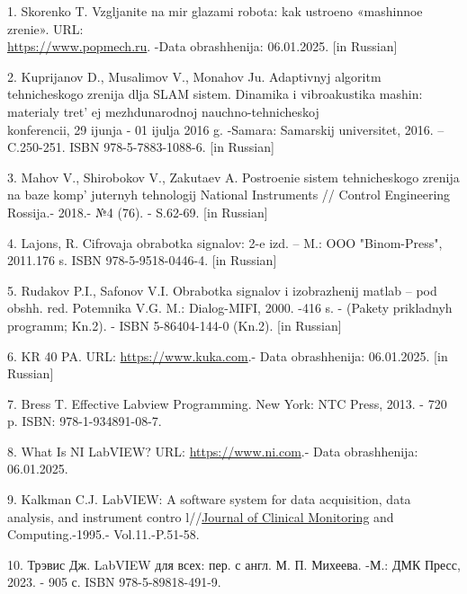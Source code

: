 \begin{references}
1. Skorenko T. Vzgljanite na mir glazami robota: kak ustroeno «mashinnoe
zrenie». URL:\\
\href{https://www.popmech.ru/technologies/238704-glazami-robota-chtotakoe-mashinnoe-zrenie/}{https://www.popmech.ru}. -Data obrashhenija: 06.01.2025. {[}in Russian{]}

2. Kuprijanov D., Musalimov V., Monahov Ju. Adaptivnyj algoritm
tehnicheskogo zrenija dlja SLAM sistem. Dinamika i vibroakustika mashin:
materialy tret' ej mezhdunarodnoj nauchno-tehnicheskoj\\
konferencii, 29 ijunja - 01 ijulja 2016 g. -Samara: Samarskij
universitet, 2016. -- C.250-251. ISBN 978-5-7883-1088-6. {[}in
Russian{]}

3. Mahov V., Shirobokov V., Zakutaev A. Postroenie sistem tehnicheskogo
zrenija na baze komp' juternyh tehnologij National
Instruments // Control Engineering Rossija.- 2018.- №4 (76). - S.62-69.
{[}in Russian{]}

4. Lajons, R. Cifrovaja obrabotka signalov: 2-e izd. -- M.: OOO
"Binom-Press", 2011.176 s. ISBN 978-5-9518-0446-4. {[}in Russian{]}

5. Rudakov P.I., Safonov V.I. Obrabotka signalov i izobrazhenij matlab
-- pod obshh. red. Potemnika V.G. M.: Dialog-MIFI, 2000. -416 s. -
(Pakety prikladnyh programm; Kn.2). - ISBN 5-86404-144-0 (Kn.2). {[}in
Russian{]}

6. KR 40 PA.
URL: \href{https://www.kuka.com/en-de/products/robot-systems/industrial-robots/kr-40-pa.html}{https://www.kuka.com}.-
Data obrashhenija: 06.01.2025. {[}in Russian{]}

7. Bress T. Effective Labview Programming. New York: NTC Press, 2013. -
720 p. ISBN: 978-1-934891-08-7.

8. What Is NI LabVIEW? URL: \href{https://www.ni.com/ru-ru/shop/labview.html}{https://www.ni.com}.-
Data obrashhenija: 06.01.2025.

9. Kalkman C.J. LabVIEW: A software system for data acquisition, data
analysis, and instrument contro
l//\href{https://link.springer.com/journal/10877}{Journal of Clinical
Monitoring} and Computing.-1995.- Vol.11.-P.51-58.

10. Трэвис Дж. LabVIEW для всех: пер. с англ. М. П. Михеева. -М.: ДМК
Пресс, 2023. - 905 с. ISBN 978-5-89818-491-9.
\end{references}

